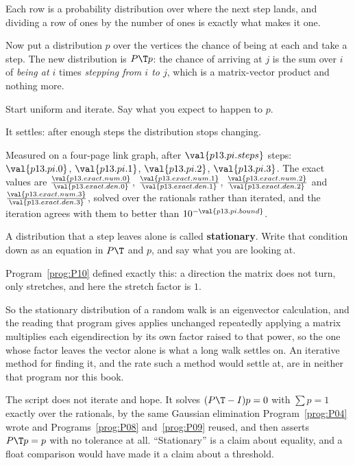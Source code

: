 \begin{fr}
Each row is a probability distribution over where the next step lands, and
dividing a row of ones by the number of ones is exactly what makes it one.

Now put a distribution $p$ over the vertices \dash{} the chance of being at
each \dash{} and take a step. The new distribution is $P\T p$: the chance of
arriving at $j$ is the sum over $i$ of \emph{being at $i$} times
\emph{stepping from $i$ to $j$}, which is a matrix-vector product and nothing
more.

Start uniform and iterate. Say what you expect to happen to $p$.
\nextframe
\end{fr}

\begin{fr}
\begin{ansblock}
It settles: after enough steps the distribution stops changing.
\end{ansblock}

Measured on a four-page link graph, after $\val{p13.pi.steps}$ steps:
$\val{p13.pi.0}$, $\val{p13.pi.1}$, $\val{p13.pi.2}$, $\val{p13.pi.3}$. The
exact values are
$\frac{\val{p13.exact.num.0}}{\val{p13.exact.den.0}}$,
$\frac{\val{p13.exact.num.1}}{\val{p13.exact.den.1}}$,
$\frac{\val{p13.exact.num.2}}{\val{p13.exact.den.2}}$ and
$\frac{\val{p13.exact.num.3}}{\val{p13.exact.den.3}}$, solved over the
rationals rather than iterated, and the iteration agrees with them to better
than $10^{-\val{p13.pi.bound}}$.

A distribution that a step leaves alone is called \textbf{stationary}. Write
that condition down as an equation in $P\T$ and $p$, and say what you are
looking at.
\dotline
\nextframe
\end{fr}

\begin{fr}
Program~\ref{prog:P10} defined exactly this: a direction the matrix does not
turn, only stretches, and here the stretch factor is $1$.

So the stationary distribution of a random walk is an eigenvector calculation,
and the reading that program gives applies unchanged \dash{} repeatedly
applying a matrix multiplies each eigendirection by its own factor raised to
that power, so the one whose factor leaves the vector alone is what a long
walk settles on. An iterative method for finding it, and the rate such a
method would settle at, are in neither that program nor this book.

\begin{note}
The script does not iterate and hope. It solves $(P\T - I)p = 0$ with
$\sum p = 1$ exactly over the rationals, by the same Gaussian elimination
Program~\ref{prog:P04} wrote and Programs~\ref{prog:P08}
and~\ref{prog:P09} reused, and then asserts $P\T p = p$ with no tolerance at
all. \enquote{Stationary} is a claim about equality, and a float comparison
would have made it a claim about a threshold.
\end{note}
\end{fr}

